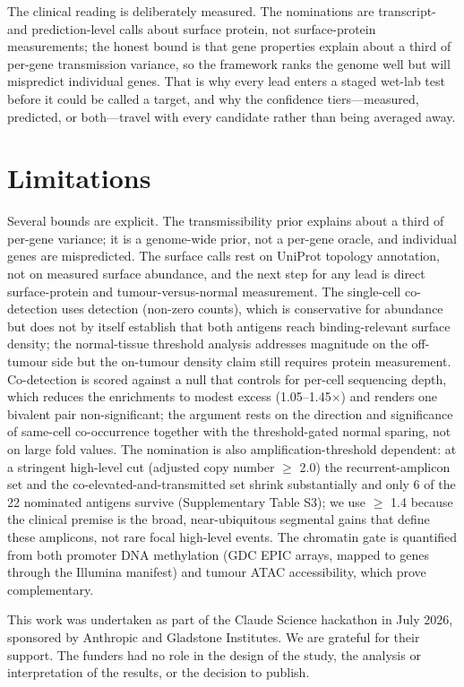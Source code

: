 \documentclass[times, twoside]{zHenriquesLab-StyleBioRxiv}
\begin{document}
The clinical reading is deliberately measured. The nominations are transcript- and prediction-level calls about surface protein, not surface-protein measurements; the honest bound is that gene properties explain about a third of per-gene transmission variance, so the framework ranks the genome well but will mispredict individual genes. That is why every lead enters a staged wet-lab test before it could be called a target, and why the confidence tiers---measured, predicted, or both---travel with every candidate rather than being averaged away.


\section*{Limitations}
Several bounds are explicit. The transmissibility prior explains about a third of per-gene variance; it is a genome-wide prior, not a per-gene oracle, and individual genes are mispredicted. The surface calls rest on UniProt topology annotation, not on measured surface abundance, and the next step for any lead is direct surface-protein and tumour-versus-normal measurement. The single-cell co-detection uses detection (non-zero counts), which is conservative for abundance but does not by itself establish that both antigens reach binding-relevant surface density; the normal-tissue threshold analysis addresses magnitude on the off-tumour side but the on-tumour density claim still requires protein measurement. Co-detection is scored against a null that controls for per-cell sequencing depth, which reduces the enrichments to modest excess (1.05--1.45$\times$) and renders one bivalent pair non-significant; the argument rests on the direction and significance of same-cell co-occurrence together with the threshold-gated normal sparing, not on large fold values. The nomination is also amplification-threshold dependent: at a stringent high-level cut (adjusted copy number $\geq$ 2.0) the recurrent-amplicon set and the co-elevated-and-transmitted set shrink substantially and only 6 of the 22 nominated antigens survive (Supplementary Table S3); we use $\geq$ 1.4 because the clinical premise is the broad, near-ubiquitous segmental gains that define these amplicons, not rare focal high-level events. The chromatin gate is quantified from both promoter DNA methylation (GDC EPIC arrays, mapped to genes through the Illumina manifest) and tumour ATAC accessibility, which prove complementary.



\begin{acknowledgements}
This work was undertaken as part of the Claude Science hackathon in July 2026, sponsored by Anthropic and Gladstone Institutes. We are grateful for their support. The funders had no role in the design of the study, the analysis or interpretation of the results, or the decision to publish.
\end{acknowledgements}
\end{document}
